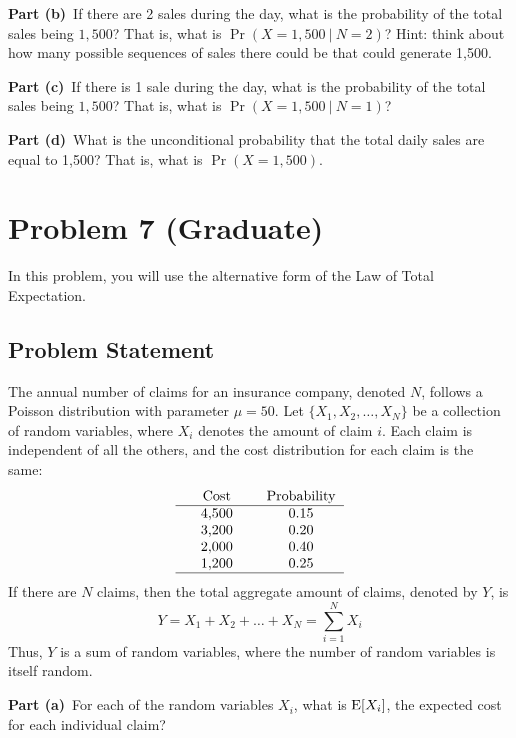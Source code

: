 \documentclass[12pt]{article}
\theoremstyle{definition}
\begin{document}
\vspace{3in}
\noindent
{\bf Part (b)}\ If there are 2 sales during the day, what is the probability of the total sales being $1,500$? That is, what is $\Pr(X = 1,500\ |\ N = 2)$? Hint: think about how many possible sequences of sales there could be that could generate 1,500.

\newpage
\noindent
{\bf Part (c)}\ If there is 1 sale during the day, what is the probability of the total sales being $1,500$? That is, what is $\Pr(X = 1,500\ |\ N = 1)$?

\vspace{3in}
\noindent
{\bf Part (d)}\ What is the unconditional probability that the total daily sales are equal to 1,500? That is, what is $\Pr(X = 1,500)$.


\newpage
\section*{Problem 7 (Graduate)}

In this problem, you will use the alternative form of the Law of Total Expectation.

\subsection*{Problem Statement}

The annual number of claims for an insurance company, denoted $N$, follows a Poisson distribution with parameter $\mu = 50$. Let $\{X_1, X_2, \ldots, X_N\}$ be a collection of random variables, where $X_i$ denotes the amount of claim $i$. Each claim is independent of all the others, and the cost distribution for each claim is the same:
$$
\begin{tabular}{ccccc}
& Cost & & Probability\\
\hline
& 4,500 & & 0.15\\
& 3,200 & & 0.20\\
& 2,000 & & 0.40\\
& 1,200 & & 0.25\\
\hline
\end{tabular}
$$
If there are $N$ claims, then the total aggregate amount of claims, denoted by $Y$, is
$$
Y = X_1 + X_2 + \ldots + X_N = \sum_{i=1}^N X_i
$$
Thus, $Y$ is a sum of random variables, where the number of random variables is itself random.

\bigskip
\noindent
{\bf Part (a)}\ For each of the random variables $X_i$, what is $\hbox{E}[X_i]$, the expected cost for each individual claim?
\end{document}
